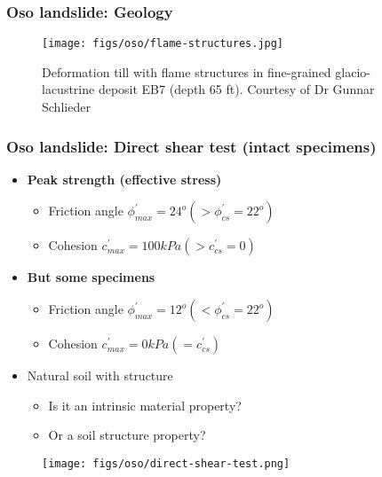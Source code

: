 \documentclass[handout]{beamer}
\begin{document}
\begin{frame}
	\frametitle{Oso landslide: Geology}
	\begin{figure}
		\texttt{[image: figs/oso/flame-structures.jpg]}
		\caption*{Deformation till with flame structures in fine-grained glacio-lacustrine deposit EB7 (depth 65 ft). Courtesy of Dr Gunnar Schlieder}
	\end{figure}
\end{frame}



\begin{frame}
	\frametitle{Oso landslide: Direct shear test (intact specimens)}
	\noindent
	\fboxsep=0pt
	\noindent
	\begin{minipage}[t]{0.65\linewidth}
		\begin{itemize}
			\item \textbf{Peak strength (effective stress)}
			\begin{itemize}
				\item Friction angle $\phi^\prime_{max} = 24^o (> \phi^\prime_{cs} = 22^o)$
				\item Cohesion $c^\prime_{max} = 100 kPa (> c^\prime_{cs} = 0)$
			\end{itemize}
				\item \textbf{But some specimens}
			\begin{itemize}
				\item Friction angle $\phi^\prime_{max} = 12^o (< \phi^\prime_{cs} = 22^o)$
				\item Cohesion $c^\prime_{max} = 0 kPa ( = c^\prime_{cs})$
			\end{itemize}
			\item Natural soil with structure
			\begin{itemize}
				\item Is it an intrinsic material property?
				\item Or a soil structure property?
			\end{itemize}
		\end{itemize}
		
	\end{minipage}%
	\hfill
	\begin{minipage}[t]{0.35\linewidth}
	\begin{figure}
		\texttt{[image: figs/oso/direct-shear-test.png]}
	\end{figure}
	\end{minipage}	
\end{frame}
\end{document}
